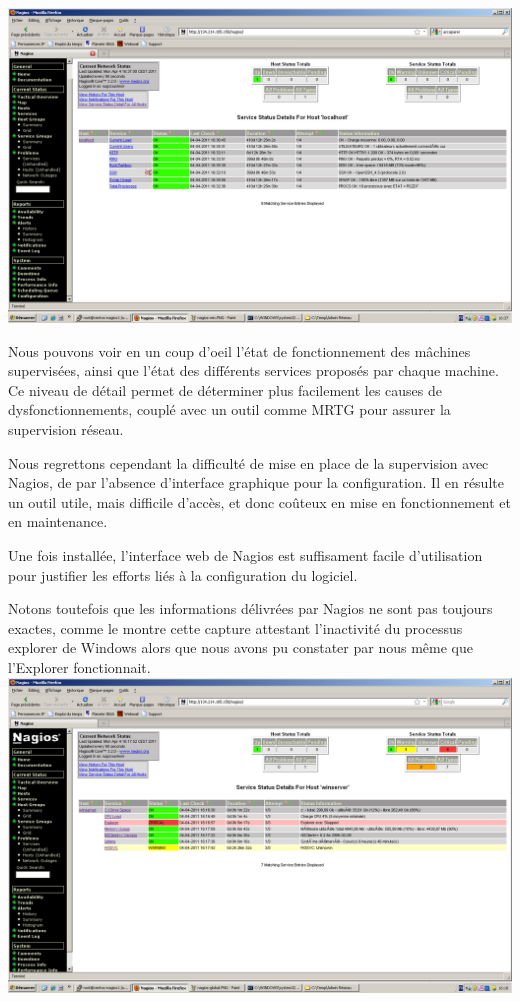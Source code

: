 \documentclass[a4paper]{article}
\begin{document}
\includegraphics[width=\linewidth]{nagios-lin.PNG}

Nous pouvons voir en un coup d'oeil l'état de fonctionnement des mâchines supervisées, ainsi que l'état des différents services proposés par chaque machine. Ce niveau de détail permet de déterminer plus facilement les causes de dysfonctionnements, couplé avec un outil comme MRTG pour assurer la supervision réseau.

Nous regrettons cependant la difficulté de mise en place de la supervision avec Nagios, de par l'absence d'interface graphique pour la configuration. Il en résulte un outil utile, mais difficile d'accès, et donc coûteux en mise en fonctionnement et en maintenance.

Une fois installée, l'interface web de Nagios est suffisament facile d'utilisation pour justifier les efforts liés à la configuration du logiciel.

Notons toutefois que les informations délivrées par Nagios ne sont pas toujours exactes, comme le montre cette capture attestant l'inactivité du processus explorer de Windows alors que nous avons pu constater par nous même que l'Explorer fonctionnait.  ~\\

\includegraphics[width=0.7\linewidth]{nagios-win.PNG}
\end{document}

